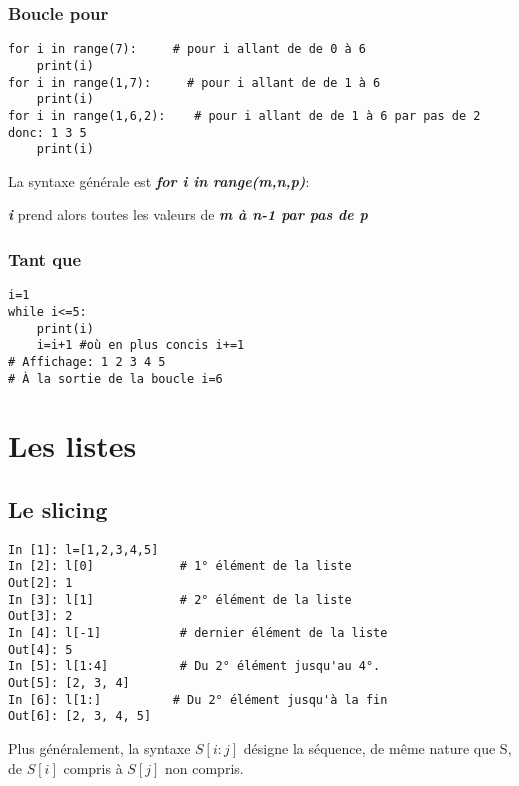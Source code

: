 \documentclass[10pt,dvipsnames,  dvips]{article}
\begin{document}
\subsubsection*{Boucle pour}

\begin{lstlisting}
for i in range(7):     # pour i allant de de 0 à 6
	print(i)
for i in range(1,7):     # pour i allant de de 1 à 6
	print(i)
for i in range(1,6,2):    # pour i allant de de 1 à 6 par pas de 2 donc: 1 3 5
	print(i)
\end{lstlisting}

La syntaxe générale est \textbf{\textit{for i in range(m,n,p)}}:

\textbf{\textit{i}} prend alors toutes les valeurs de \textbf{\textit{m à n-1 par pas de p}}

\subsubsection*{Tant que}

\begin{lstlisting}
i=1
while i<=5:
	print(i)
	i=i+1 #où en plus concis i+=1
# Affichage: 1 2 3 4 5
# À la sortie de la boucle i=6
\end{lstlisting}






\section{Les listes}

\subsection{Le slicing}%


\begin{lstlisting}
In [1]: l=[1,2,3,4,5]
In [2]: l[0]            # 1° élément de la liste
Out[2]: 1
In [3]: l[1]            # 2° élément de la liste
Out[3]: 2
In [4]: l[-1]           # dernier élément de la liste
Out[4]: 5
In [5]: l[1:4]          # Du 2° élément jusqu'au 4°.
Out[5]: [2, 3, 4]
In [6]: l[1:]          # Du 2° élément jusqu'à la fin
Out[6]: [2, 3, 4, 5]
\end{lstlisting}

Plus généralement, la syntaxe $S[i:j]$ désigne la séquence, de même nature que S, de $S[i]$ compris à $S[j]$ non compris.
\end{document}
